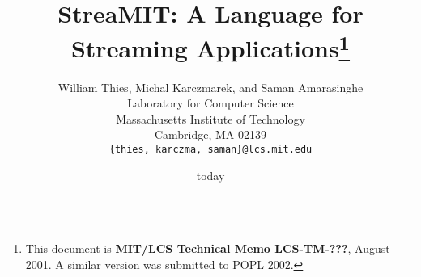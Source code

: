 \documentclass[psfig]{acm_proc_article-sp}
\begin{document}
\title{StreaMIT: A Language for Streaming Applications\thanks{This
document is {\bf MIT/LCS Technical Memo LCS-TM-???}, August 2001.  A
similar version was submitted to POPL 2002.}}

\author{
\alignauthor William Thies, Michal Karczmarek, and Saman Amarasinghe\\
	\vspace{12pt}
	Laboratory for Computer Science \\
	Massachusetts Institute of Technology \\
	Cambridge, MA  02139 \\
	\vspace{12pt}
	{\tt \{thies, karczma, saman\}@lcs.mit.edu}
}

\date{today}

\newcommand{\ma}[2]{max_{#1 \rightarrow #2}}
\newcommand{\mal}[1]{maxloop_{#1 \rightarrow #1}}
\newcommand{\mi}[2]{min_{#1 \leftarrow #2}}

\maketitle

\begin{abstract}

\end{abstract}












\end{document}
